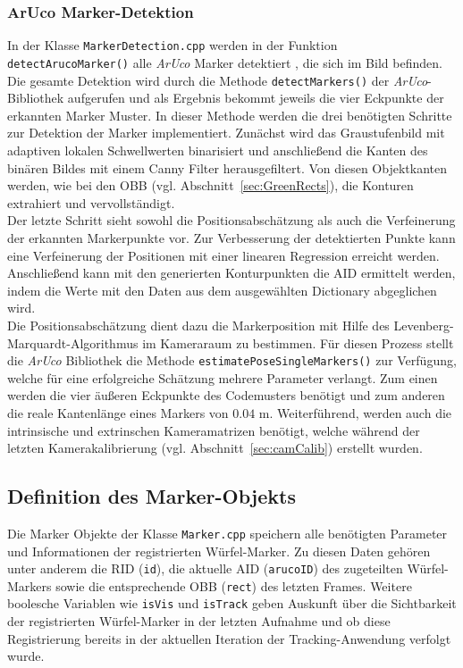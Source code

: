\subsubsection{ArUco Marker-Detektion}\label{sec:ArucoMarkerTracking}%
 In der Klasse \texttt{Marker\-Detection.cpp} werden in der Funktion \texttt{detect\-Aruco\-Marker()} alle \textit{ArUco} Marker detektiert \cite{article:Aruco2014}, die sich im Bild befinden. Die gesamte Detektion wird durch die Methode \texttt{detect\-Markers()} der \textit{ArUco}-Bibliothek aufgerufen und als Ergebnis bekommt jeweils die vier Eckpunkte der erkannten Marker Muster. In dieser Methode werden die drei benötigten Schritte zur Detektion der Marker implementiert. Zunächst wird das Graustufenbild mit adaptiven lokalen Schwellwerten binarisiert und anschließend die Kanten des binären Bildes mit einem Canny Filter \cite{article:Canny} herausgefiltert. Von diesen Objektkanten werden, wie bei den OBB (vgl. Abschnitt~\ref{sec:GreenRects}), die Konturen extrahiert und vervollständigt.\\  
 Der letzte Schritt sieht sowohl die Positionsabschätzung als auch die Verfeinerung der erkannten Markerpunkte vor. Zur Verbesserung der detektierten Punkte kann eine Verfeinerung der Positionen mit einer linearen Regression erreicht werden. Anschließend kann mit den generierten Konturpunkten die AID ermittelt werden, indem die Werte mit den Daten aus dem ausgewählten Dictionary abgeglichen wird.\\
 Die Positionsabschätzung dient dazu die Markerposition mit Hilfe des Levenberg-Marquardt-Algorithmus \cite{article:Levenberg} im Kameraraum zu bestimmen. Für diesen Prozess stellt die \textit{ArUco} Bibliothek die Methode \texttt{esti\-mate\-Pose\-Single\-Markers()} zur Verfügung, welche für eine erfolgreiche Schätzung mehrere Parameter verlangt. Zum einen werden die vier äußeren Eckpunkte des Codemusters benötigt und zum anderen die reale Kantenlänge eines Markers von $0.04$ m. Weiterführend, werden auch die intrinsische und extrinschen Kameramatrizen benötigt, welche während der letzten Kamerakalibrierung (vgl. Abschnitt~\ref{sec:camCalib}) erstellt wurden.
 
\subsection{Definition des Marker-Objekts}\label{sec:MarkerObjekte}%
Die Marker Objekte der Klasse \texttt{Marker.cpp} speichern alle benötigten Parameter und Informationen der registrierten Würfel-Marker. Zu diesen Daten gehören unter anderem die RID (\texttt{id}), die aktuelle AID (\texttt{arucoID}) des zugeteilten Würfel-Markers sowie die entsprechende OBB (\texttt{rect}) des letzten Frames. Weitere boolesche Variablen wie \texttt{isVis} und \texttt{isTrack} geben Auskunft über die Sichtbarkeit der registrierten Würfel-Marker in der letzten Aufnahme und ob diese Registrierung bereits in der aktuellen Iteration der Tracking-Anwendung verfolgt wurde.

